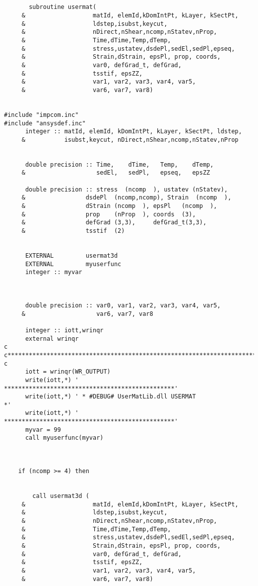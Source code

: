 \begin{lstlisting}

  
       subroutine usermat(
     &                   matId, elemId,kDomIntPt, kLayer, kSectPt,
     &                   ldstep,isubst,keycut,
     &                   nDirect,nShear,ncomp,nStatev,nProp,
     &                   Time,dTime,Temp,dTemp,
     &                   stress,ustatev,dsdePl,sedEl,sedPl,epseq,
     &                   Strain,dStrain, epsPl, prop, coords, 
     &                   var0, defGrad_t, defGrad,
     &                   tsstif, epsZZ,
     &                   var1, var2, var3, var4, var5,
     &                   var6, var7, var8)
	
	
#include "impcom.inc"
#include "ansysdef.inc"
      integer :: matId, elemId, kDomIntPt, kLayer, kSectPt, ldstep,
     &           isubst,keycut, nDirect,nShear,ncomp,nStatev,nProp


      double precision :: Time,    dTime,   Temp,    dTemp,
     &                    sedEl,   sedPl,   epseq,   epsZZ
                  
      double precision :: stress  (ncomp  ), ustatev (nStatev), 
     &                 dsdePl  (ncomp,ncomp), Strain  (ncomp  ), 
     &                 dStrain (ncomp  ), epsPl   (ncomp  ),
     &                 prop    (nProp  ), coords  (3), 
     &                 defGrad (3,3),     defGrad_t(3,3),  
     &                 tsstif  (2) 
	
	
      EXTERNAL         usermat3d
      EXTERNAL         myuserfunc
      integer :: myvar
	
	
	
      double precision :: var0, var1, var2, var3, var4, var5,
     &                    var6, var7, var8

      integer :: iott,wrinqr
      external wrinqr
c
c*************************************************************************
c
      iott = wrinqr(WR_OUTPUT)
      write(iott,*) ' ************************************************'
      write(iott,*) ' * #DEBUG# UserMatLib.dll USERMAT               *'
      write(iott,*) ' ************************************************'
      myvar = 99
      call myuserfunc(myvar)
	
	

	if (ncomp >= 4) then
	
		
		call usermat3d (
     &                   matId, elemId,kDomIntPt, kLayer, kSectPt,
     &                   ldstep,isubst,keycut,
     &                   nDirect,nShear,ncomp,nStatev,nProp,
     &                   Time,dTime,Temp,dTemp,
     &                   stress,ustatev,dsdePl,sedEl,sedPl,epseq,
     &                   Strain,dStrain, epsPl, prop, coords,
     &                   var0, defGrad_t, defGrad,
     &                   tsstif, epsZZ,
     &                   var1, var2, var3, var4, var5,
     &                   var6, var7, var8)



\end{lstlisting}
